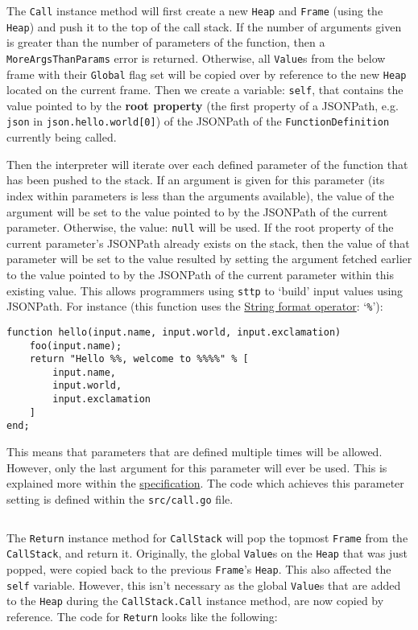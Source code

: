 The \verb|Call| instance method will first create a new \verb|Heap| and \verb|Frame| (using the \verb|Heap|) and push it to the top of the call stack. If the number of arguments given is greater than the number of parameters of the function, then a \verb|MoreArgsThanParams| error is returned. Otherwise, all \verb|Value|s from the below frame with their \verb|Global| flag set will be copied over by reference to the new \verb|Heap| located on the current frame. Then we create a variable: \verb|self|, that contains the value pointed to by the \textbf{root property} (the first property of a JSONPath, e.g. \verb|json| in \verb|json.hello.world[0]|) of the JSONPath of the \verb|FunctionDefinition| currently being called.

Then the interpreter will iterate over each defined parameter of the function that has been pushed to the stack. If an argument is given for this parameter (its index within parameters is less than the arguments available), the value of the argument will be set to the value pointed to by the JSONPath of the current parameter. Otherwise, the value: \verb|null| will be used. If the root property of the current parameter's JSONPath already exists on the stack, then the value of that parameter will be set to the value resulted by setting the argument fetched earlier to the value pointed to by the JSONPath of the current parameter within this existing value. This allows programmers using \verb|sttp| to `build' input values using JSONPath. For instance (this function uses the \hyperref[sec:explanation-mod-string-interpolation]{String format operator}: `\verb|%|'):

\begin{verbatim}
function hello(input.name, input.world, input.exclamation)
    foo(input.name);
    return "Hello %%, welcome to %%%%" % [
        input.name,
        input.world,
        input.exclamation
    ]
end;
\end{verbatim}

This means that parameters that are defined multiple times will be allowed. However, only the last argument for this parameter will ever be used. This is explained more within the \hyperref[sec:function-heap]{specification}. The code which achieves this parameter setting is defined within the \verb|src/call.go| file.

\inputminted[firstline=88, lastline=130, autogobble, breaklines, tabsize=4]{go}{../../src/call.go}

The \verb|Return| instance method for \verb|CallStack| will pop the topmost \verb|Frame| from the \verb|CallStack|, and return it. Originally, the global \verb|Value|s on the \verb|Heap| that was just popped, were copied back to the previous \verb|Frame|'s \verb|Heap|. This also affected the \verb|self| variable. However, this isn't necessary as the global \verb|Value|s that are added to the \verb|Heap| during the \verb|CallStack.Call| instance method, are now copied by reference. The code for \verb|Return| looks like the following:

